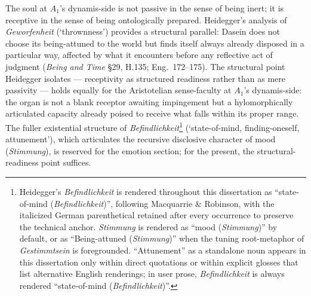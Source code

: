 The soul at $A_1$'s dynamis-side is not passive in the sense of being inert; it is receptive in the sense of being ontologically prepared. Heidegger's analysis of \textit{Geworfenheit} (`thrownness') provides a structural parallel: Dasein does not choose its being-attuned to the world but finds itself always already disposed in a particular way, affected by what it encounters before any reflective act of judgment (\textit{Being and Time} \S 29, H.135; Eng.~172--175). The structural point Heidegger isolates --- receptivity as structured readiness rather than as mere passivity --- holds equally for the Aristotelian sense-faculty at $A_1$'s dynamis-side: the organ is not a blank receptor awaiting impingement but a hylomorphically articulated capacity already poised to receive what falls within its proper range. The fuller existential structure of \textit{Befindlichkeit}\footnote{Heidegger's \textit{Befindlichkeit} is rendered throughout this dissertation as ``state-of-mind (\textit{Befindlichkeit})'', following Macquarrie \& Robinson, with the italicized German parenthetical retained after every occurrence to preserve the technical anchor. \textit{Stimmung} is rendered as ``mood (\textit{Stimmung})'' by default, or as ``Being-attuned (\textit{Stimmung})'' when the tuning root-metaphor of \textit{Gestimmtsein} is foregrounded. ``Attunement'' as a standalone noun appears in this dissertation only within direct quotations or within explicit glosses that list alternative English renderings; in user prose, \textit{Befindlichkeit} is always rendered ``state-of-mind (\textit{Befindlichkeit})''.} (`state-of-mind, finding-oneself, attunement'), which articulates the recursive disclosive character of mood (\textit{Stimmung}), is reserved for the emotion section; for the present, the structural-readiness point suffices.

